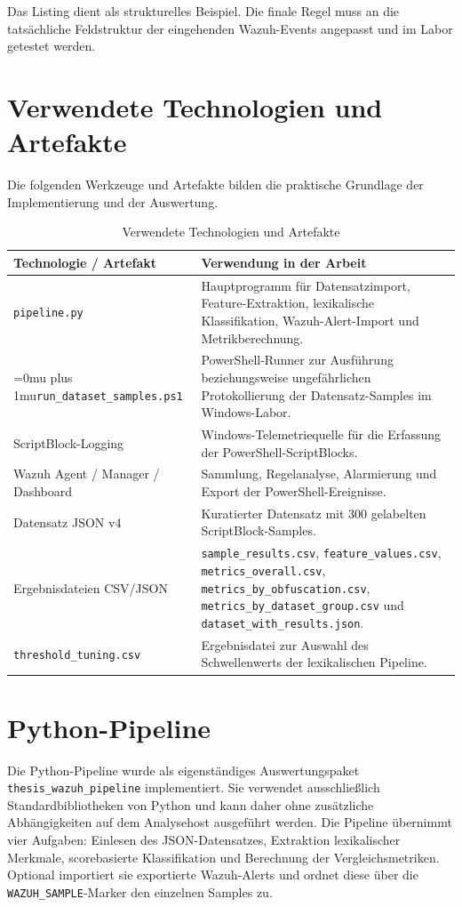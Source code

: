 \documentclass[12pt,a4paper,oneside,parskip=half]{scrreprt}
\newcommand{\codecell}[1]{\begingroup\Urlmuskip=0mu plus 1mu\relax\nolinkurl{#1}\endgroup}
\newcommand{\codebreak}[2]{\codecell{#1#2}}
\begin{document}
Das Listing dient als strukturelles Beispiel. Die finale Regel muss an die tatsächliche Feldstruktur der eingehenden Wazuh-Events angepasst und im Labor getestet werden.

\section{Verwendete Technologien und Artefakte}
Die folgenden Werkzeuge und Artefakte bilden die praktische Grundlage der Implementierung und der Auswertung.

\begin{table}[H]
\centering
\caption{Verwendete Technologien und Artefakte}
\small
\begin{tabularx}{\textwidth}{|L{5cm}|Y|}
\hline
\textbf{Technologie / Artefakt} & \textbf{Verwendung in der Arbeit}\\
\hline
\texttt{pipeline.py} & Hauptprogramm für Datensatzimport, Feature-Extraktion, lexikalische Klassifikation, Wazuh-Alert-Import und Metrikberechnung.\\
\hline
\codebreak{run\_dataset}{\_samples.ps1} & PowerShell-Runner zur Ausführung beziehungsweise ungefährlichen Protokollierung der Datensatz-Samples im Windows-Labor.\\
\hline
ScriptBlock-Logging & Windows-Telemetriequelle für die Erfassung der PowerShell-ScriptBlocks.\\
\hline
Wazuh Agent / Manager / Dashboard & Sammlung, Regelanalyse, Alarmierung und Export der PowerShell-Ereignisse.\\
\hline
Datensatz JSON v4 & Kuratierter Datensatz mit 300 gelabelten ScriptBlock-Samples.\\
\hline
Ergebnisdateien CSV/JSON & \texttt{sample\_results.csv}, \texttt{feature\_values.csv}, \texttt{metrics\_overall.csv}, \texttt{metrics\_by\_obfuscation.csv}, \texttt{metrics\_by\_dataset\_group.csv} und \texttt{dataset\_with\_results.json}.\\
\hline
\texttt{threshold\_tuning.csv} & Ergebnisdatei zur Auswahl des Schwellenwerts der lexikalischen Pipeline.\\
\hline
\end{tabularx}
\end{table}

\section{Python-Pipeline}
Die Python-Pipeline wurde als eigenständiges Auswertungspaket \texttt{thesis\_wazuh\_pipeline} implementiert. Sie verwendet ausschließlich Standardbibliotheken von Python und kann daher ohne zusätzliche Abhängigkeiten auf dem Analysehost ausgeführt werden. Die Pipeline übernimmt vier Aufgaben: Einlesen des JSON-Datensatzes, Extraktion lexikalischer Merkmale, scorebasierte Klassifikation und Berechnung der Vergleichsmetriken. Optional importiert sie exportierte Wazuh-Alerts und ordnet diese über die \texttt{WAZUH\_SAMPLE}-Marker den einzelnen Samples zu.
\end{document}
